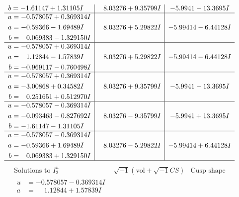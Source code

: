 \documentclass[1p]{elsarticle_modified}
\theoremstyle{definition}
\newcommand{\I}{\sqrt{-1}}
\begin{document}
$$\begin{array}{c|c|c}
\begin{aligned}
b &= -1.61147 + 1.31105 I\end{aligned}
 & \phantom{-}8.03276 + 9.35799 I & -5.9941 - 13.3695 I \\ \hline\begin{aligned}
u &= -0.578057 + 0.369314 I \\
a &= -0.59366 - 1.69489 I \\
b &= \phantom{-}0.069383 - 1.329150 I\end{aligned}
 & \phantom{-}8.03276 + 5.29822 I & -5.99414 - 6.44128 I \\ \hline\begin{aligned}
u &= -0.578057 + 0.369314 I \\
a &= \phantom{-}1.12844 - 1.57839 I \\
b &= -0.969117 - 0.760498 I\end{aligned}
 & \phantom{-}8.03276 + 5.29822 I & -5.99414 - 6.44128 I \\ \hline\begin{aligned}
u &= -0.578057 + 0.369314 I \\
a &= -3.00868 + 0.34582 I \\
b &= \phantom{-}0.251651 + 0.512970 I\end{aligned}
 & \phantom{-}8.03276 + 9.35799 I & -5.9941 - 13.3695 I \\ \hline\begin{aligned}
u &= -0.578057 - 0.369314 I \\
a &= -0.093463 - 0.827692 I \\
b &= -1.61147 - 1.31105 I\end{aligned}
 & \phantom{-}8.03276 - 9.35799 I & -5.9941 + 13.3695 I \\ \hline\begin{aligned}
u &= -0.578057 - 0.369314 I \\
a &= -0.59366 + 1.69489 I \\
b &= \phantom{-}0.069383 + 1.329150 I\end{aligned}
 & \phantom{-}8.03276 - 5.29822 I & -5.99414 + 6.44128 I\\
 \hline 
 \end{array}$$\newpage$$\begin{array}{c|c|c}  
\text{Solutions to }I^u_{2}& \I (\text{vol} + \sqrt{-1}CS) & \text{Cusp shape}\\
 \hline 
\begin{aligned}
u &= -0.578057 - 0.369314 I \\
a &= \phantom{-}1.12844 + 1.57839 I \\

\end{aligned}
\end{array}$$
\end{document}
